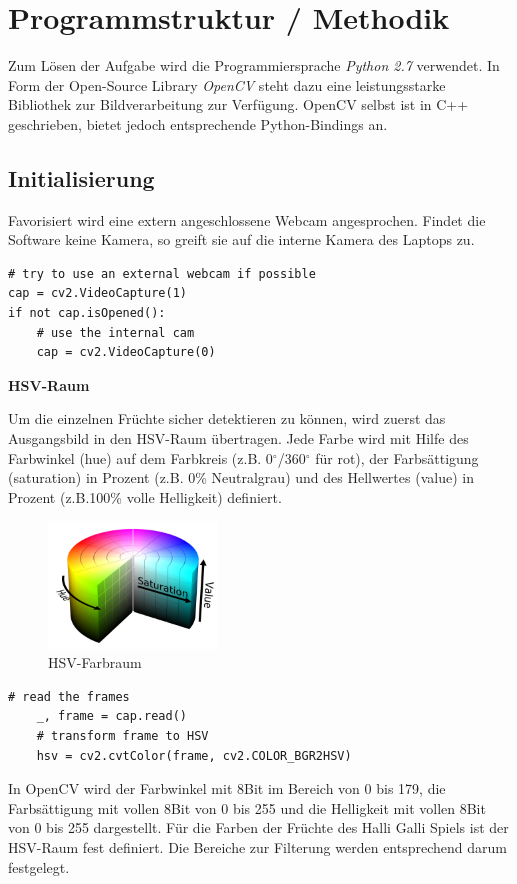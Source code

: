 
\section{Programmstruktur / Methodik}
\label{sec:Programmstruktur}

Zum Lösen der Aufgabe wird die Programmiersprache \emph{Python 2.7} verwendet. In Form der Open-Source Library \emph{OpenCV} steht dazu eine leistungsstarke Bibliothek zur Bildverarbeitung zur Verfügung.
OpenCV selbst ist in C++ geschrieben, bietet jedoch entsprechende Python-Bindings an.


\subsection{Initialisierung}

Favorisiert wird eine extern angeschlossene Webcam angesprochen. Findet die Software keine Kamera, so greift sie auf die interne Kamera des Laptops zu. 

\lstset{language=Python}
\begin{lstlisting}[]
# try to use an external webcam if possible
cap = cv2.VideoCapture(1)
if not cap.isOpened():
    # use the internal cam
    cap = cv2.VideoCapture(0)
\end{lstlisting}

\textbf{HSV-Raum}

Um die einzelnen Früchte sicher detektieren zu können, wird zuerst das Ausgangsbild in den HSV-Raum übertragen. Jede Farbe wird mit Hilfe des Farbwinkel (hue) auf dem Farbkreis (z.B. 0$^\circ$/360$^\circ$  für rot), der Farbsättigung (saturation) in Prozent (z.B. 0\% Neutralgrau) und des Hellwertes (value) in Prozent (z.B.100\% volle Helligkeit) definiert.
\begin{figure}[H]
    \centering
    \includegraphics[width=0.4\textwidth]{Abbildungen/HSV_color}
    \caption[HSV]{HSV-Farbraum}
    \label{fig:HSV-Farbraum}
\end{figure}
\begin{lstlisting}[]
    # read the frames
    _, frame = cap.read()
    # transform frame to HSV
    hsv = cv2.cvtColor(frame, cv2.COLOR_BGR2HSV)
\end{lstlisting}
In OpenCV wird der Farbwinkel mit 8Bit im Bereich von 0 bis 179, die Farbsättigung mit vollen 8Bit von 0 bis 255 und die Helligkeit mit vollen 8Bit von 0 bis 255 dargestellt.
Für die Farben der Früchte des Halli Galli Spiels ist der HSV-Raum fest definiert. Die Bereiche zur Filterung werden entsprechend darum festgelegt. 

